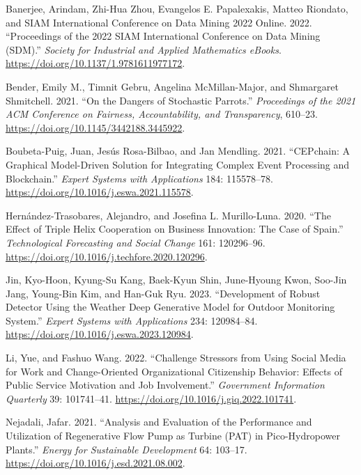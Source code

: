 \documentclass[
  12pt,
]{article}
\newlength{\cslhangindent}
\newenvironment{CSLReferences}[2] %
 {\begin{list}{}{%
  \setlength{\itemindent}{0pt}
  \setlength{\leftmargin}{0pt}
  \setlength{\parsep}{0pt}
  \ifodd #1
   \setlength{\leftmargin}{\cslhangindent}
   \setlength{\itemindent}{-1\cslhangindent}
  \fi
  \setlength{\itemsep}{#2\baselineskip}}}
 {\end{list}}
\begin{document}
\label{refs}
\begin{CSLReferences}{1}{0}
Banerjee, Arindam, Zhi-Hua Zhou, Evangelos E. Papalexakis, Matteo
Riondato, and SIAM International Conference on Data Mining 2022 Online.
2022. {``Proceedings of the 2022 SIAM International Conference on Data
Mining (SDM).''} \emph{Society for Industrial and Applied Mathematics
eBooks}. \url{https://doi.org/10.1137/1.9781611977172}.

Bender, Emily M., Timnit Gebru, Angelina McMillan-Major, and Shmargaret
Shmitchell. 2021. {``On the Dangers of Stochastic Parrots.''}
\emph{Proceedings of the 2021 ACM Conference on Fairness,
Accountability, and Transparency}, 610--23.
\url{https://doi.org/10.1145/3442188.3445922}.

Boubeta-Puig, Juan, Jesús Rosa-Bilbao, and Jan Mendling. 2021.
{``CEPchain: A Graphical Model-Driven Solution for Integrating Complex
Event Processing and Blockchain.''} \emph{Expert Systems with
Applications} 184: 115578--78.
\url{https://doi.org/10.1016/j.eswa.2021.115578}.

Hernández-Trasobares, Alejandro, and Josefina L. Murillo-Luna. 2020.
{``The Effect of Triple Helix Cooperation on Business Innovation: The
Case of Spain.''} \emph{Technological Forecasting and Social Change}
161: 120296--96. \url{https://doi.org/10.1016/j.techfore.2020.120296}.

Jin, Kyo-Hoon, Kyung-Su Kang, Baek-Kyun Shin, June-Hyoung Kwon, Soo-Jin
Jang, Young-Bin Kim, and Han-Guk Ryu. 2023. {``Development of Robust
Detector Using the Weather Deep Generative Model for Outdoor Monitoring
System.''} \emph{Expert Systems with Applications} 234: 120984--84.
\url{https://doi.org/10.1016/j.eswa.2023.120984}.

Li, Yue, and Fashuo Wang. 2022. {``Challenge Stressors from Using Social
Media for Work and Change-Oriented Organizational Citizenship Behavior:
Effects of Public Service Motivation and Job Involvement.''}
\emph{Government Information Quarterly} 39: 101741--41.
\url{https://doi.org/10.1016/j.giq.2022.101741}.

Nejadali, Jafar. 2021. {``Analysis and Evaluation of the Performance and
Utilization of Regenerative Flow Pump as Turbine (PAT) in
Pico-Hydropower Plants.''} \emph{Energy for Sustainable Development} 64:
103--17. \url{https://doi.org/10.1016/j.esd.2021.08.002}.


\end{CSLReferences}
\end{document}
